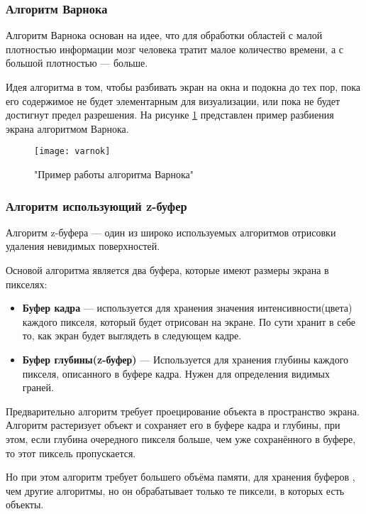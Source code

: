 \subsubsection{Алгоритм Варнока}

Алгоритм Варнока основан на идее, что для обработки областей с малой плотностью информации мозг человека тратит малое количество времени, а с большой плотностью — больше.

Идея алгоритма в том, чтобы разбивать экран на окна и подокна до тех пор, пока его содержимое не будет элементарным для визуализации, или пока не будет достигнут предел разрешения. На рисунке \ref{fig:varnok} представлен пример разбиения экрана алгоритмом Варнока.

\begin{figure}[H]
	\centering
	\texttt{[image: varnok]}
	\caption{"Пример работы алгоритма Варнока"}
	\label{fig:varnok}
\end{figure}

\subsubsection{Алгоритм использующий z-буфер}
Алгоритм z-буфера — один из широко используемых алгоритмов отрисовки удаления невидимых поверхностей.

Основой алгоритма является два буфера, которые имеют размеры экрана в пикселях:

\begin{itemize}
	\item \textbf{Буфер кадра} — используется для хранения значения интенсивности(цвета) каждого пикселя, который будет отрисован на экране. По сути хранит в себе то, как экран будет выглядеть в следующем кадре.
	\item \textbf{Буфер глубины(z-буфер)} — Используется для хранения глубины каждого пикселя, описанного в буфере кадра. Нужен для определения видимых граней.
\end{itemize}

Предварительно алгоритм требует проецирование объекта в пространство экрана. Алгоритм растеризует объект и сохраняет его в буфере кадра и глубины, при этом, если глубина очередного пикселя больше, чем уже сохранённого в буфере, то этот пиксель пропускается.

Но при этом алгоритм требует большего объёма памяти, для хранения буферов \cite{rodgers}, чем другие алгоритмы, но он обрабатывает только те пиксели, в которых есть объекты.

